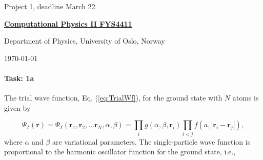 \documentclass[oneside,onecolumn,9pt]{article}
\begin{document}

\newcommand{\exercisesection}[1]{\subsection*{#1}}






\thispagestyle{empty}

\begin{center}
{\LARGE\bf
\begin{spacing}{1.25}
Project 1, deadline  March 22 
\end{spacing}
}
\end{center}


\begin{center}
{\bf \href{{https://www.uio.no/studier/emner/matnat/fys/FYS4411/v19/index.html}}{Computational Physics II FYS4411}}
\end{center}

\begin{center}
\centerline{{\small Department of Physics, University of Oslo, Norway}}
\end{center}
    

\begin{center}
\today
\end{center}

\vspace{1cm}



\paragraph{Task: 1a}
The trial wave function, Eq. (\ref{eq:TrialWf}), for the ground state with $N$ atoms is given by

\begin{equation}
 \Psi_T(\mathbf{r})=\Psi_T(\mathbf{r}_1, \mathbf{r}_2, \dots \mathbf{r}_N,\alpha,\beta)=\prod_i g(\alpha,\beta,\mathbf{r}_i)\prod_{i<j}f(a,|\mathbf{r}_i-\mathbf{r}_j|),
 \label{eq:TrialWf}
 \end{equation}
 where $\alpha$ and $\beta$ are variational parameters. The
 single-particle wave function is proportional to the harmonic
 oscillator function for the ground state, i.e.,
 
\end{document}

